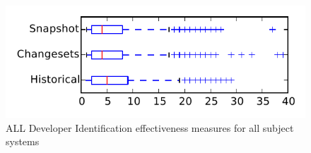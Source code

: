 
\begin{figure}
\centering
\includegraphics[height=0.4\textheight]{figures/dit/all_tiny}
\caption{ALL Developer Identification effectiveness measures for all subject systems}
\label{fig:dit:all:tiny}
\end{figure}
